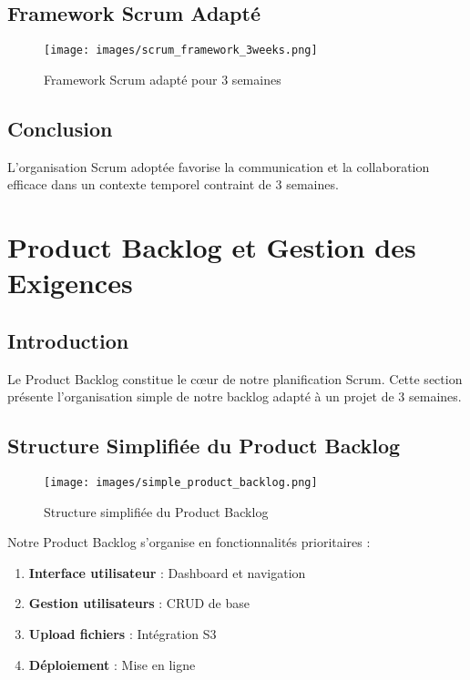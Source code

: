 \subsection{Framework Scrum Adapté}

\begin{figure}[H]
    \centering
    \texttt{[image: images/scrum\_framework\_3weeks.png]}
    \caption{Framework Scrum adapté pour 3 semaines}
    \label{fig:scrum_framework}
\end{figure}

\subsection{Conclusion}

L'organisation Scrum adoptée favorise la communication et la collaboration efficace dans un contexte temporel contraint de 3 semaines.

\section{Product Backlog et Gestion des Exigences}

\subsection{Introduction}

Le Product Backlog constitue le cœur de notre planification Scrum. Cette section présente l'organisation simple de notre backlog adapté à un projet de 3 semaines.

\subsection{Structure Simplifiée du Product Backlog}

\begin{figure}[H]
    \centering
    \texttt{[image: images/simple\_product\_backlog.png]}
    \caption{Structure simplifiée du Product Backlog}
    \label{fig:product_backlog}
\end{figure}

Notre Product Backlog s'organise en fonctionnalités prioritaires :

\begin{enumerate}
    \item \textbf{Interface utilisateur} : Dashboard et navigation
    \item \textbf{Gestion utilisateurs} : CRUD de base
    \item \textbf{Upload fichiers} : Intégration S3
    \item \textbf{Déploiement} : Mise en ligne
\end{enumerate}


